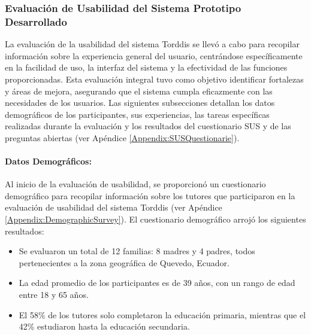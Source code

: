 \documentclass[a4paper,fleqn]{cas-sc}
\begin{document}
				\subsubsection*{Evaluación de Usabilidad del Sistema Prototipo Desarrollado}
					La evaluación de la usabilidad del sistema Torddis se llevó a cabo para recopilar información sobre la experiencia general del usuario, centrándose específicamente en la facilidad de uso, la interfaz del sistema y la efectividad de las funciones proporcionadas. Esta evaluación integral tuvo como objetivo identificar fortalezas y áreas de mejora, asegurando que el sistema cumpla eficazmente con las necesidades de los usuarios. Las siguientes subsecciones detallan los datos demográficos de los participantes, sus experiencias, las tareas específicas realizadas durante la evaluación y los resultados del cuestionario SUS y de las preguntas abiertas (ver Apéndice \ref{Appendix:SUSQuestionarie}).
				
					\paragraph{\textbf{Datos Demográficos:}}
						Al inicio de la evaluación de usabilidad, se proporcionó un cuestionario demográfico para recopilar información sobre los tutores que participaron en la evaluación de usabilidad del sistema Torddis (ver Apéndice \ref{Appendix:DemographicSurvey}). El cuestionario demográfico arrojó los siguientes resultados:
				
						\begin{itemize}
							\item Se evaluaron un total de 12 familias: 8 madres y 4 padres, todos pertenecientes a la zona geográfica de Quevedo, Ecuador.
							\item La edad promedio de los participantes es de 39 años, con un rango de edad entre 18 y 65 años.
							\item El 58\% de los tutores solo completaron la educación primaria, mientras que el 42\% estudiaron hasta la educación secundaria.
						\end{itemize}
						
\end{document}
